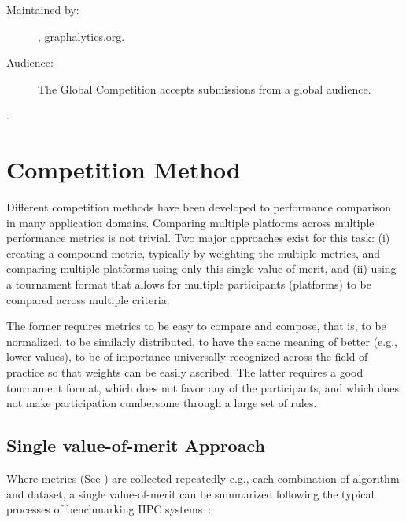 \begin{description}
    \item[Maintained by:] \toolname, \url{graphalytics.org}.
    \item[Audience:] The Global \toolname{} Competition accepts submissions from a global audience.
\end{description} 



 .








\section{Competition Method} \label{sec:competitions}
Different competition methods have been developed to performance comparison in many application domains. Comparing multiple platforms across multiple performance metrics is not trivial. Two major approaches exist for this task: (i) creating a compound metric, typically by weighting the multiple metrics, and comparing multiple platforms using only this single-value-of-merit, and (ii) using a tournament format that allows for multiple participants (platforms) to be compared across multiple criteria. 

The former requires metrics to be easy to compare and compose, that is, to be normalized, to be similarly distributed, to have the same meaning of better (e.g., lower values), to be of importance universally recognized across the field of practice so that weights can be easily ascribed. The latter requires a good tournament format, which does not favor any of the participants, and which does not make participation cumbersome through a large set of rules.


\subsection{Single value-of-merit Approach} \label{sec:competitions:single_value}
Where metrics (See ) are collected repeatedly e.g., each combination of algorithm and dataset, a single value-of-merit can be summarized following the typical processes of benchmarking HPC systems~\cite{DBLP:conf/sc/HoeflerB15}:

